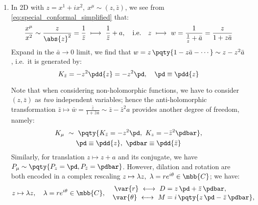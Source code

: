 \documentclass[a4paper,10pt]{article}
\begin{document}
\begin{enumerate}
\begin{enumerate}
	
	\item In 2D with $z = x^1 + ix^2,\ x^\mu\sim (z,\bar{z})$, we see from \eqref{eq:special_conformal_simplified} that:
	\begin{equation}
		\frac{x^\mu}{x^2}
		\sim \frac{z}{\abs{z}^2}
		= \frac{1}{\bar{z}}
		\ \longmapsto\ %
		\frac{1}{\bar{z}} + a,\quad
		\text{i.e.}\quad
		z\ \longmapsto\ 
		w = \frac{1}{\frac{1}{z} + \bar{a}}
		= \frac{z}{1 + z\bar{a}}
	\end{equation}
	Expand in the $\bar{a}\to 0$ limit, we find that $
		w = z\,\pqty{
			1 - z\bar{a} - \cdots
		} \sim z - z^2 \bar{a}
	$, i.e.\ it is generated by:
	\begin{equation}
		K_{\bar{z}}
		= -z^2 \pdd{z}
		= -z^2 \pd,\quad
		\pd \equiv \pdd{z}
	\end{equation}
\pagebreak[3]
	
	Note that when considering non-holomorphic functions, we have to consider $(z,\bar{z})$ as \textit{two} independent variables; hence the anti-holomorphic transformation $
		\bar{z}\mapsto\bar{w}
		= \frac{\bar{z}}{1 + \bar{z} a}
		\sim \bar{z} - \bar{z}^2 a
	$ provides another degree of freedom, namely:
	\begin{gather}
		K_\mu\ \sim\ \pqty{
			K_{\bar{z}} = -z^2 \pd,\ %
			K_{{z}} = -\bar{z}^2 \pdbar
		},\\
		\pd \equiv \pdd{z},\ %
		\pdbar \equiv \pdd{\bar{z}}\notag
	\end{gather}
	Similarly, for translation $z\mapsto z+a$ and its conjugate, we have $
		P_\mu\sim
		\pqty{P_z = \pd, P_{\bar{z}} = \pdbar}
	$. However, dilation and rotation are both encoded in a complex rescaling $
		z\mapsto \lambda z,\ %
		\lambda = re^{i\theta}\in\mbb{C}
	$; we have:
	\begin{equation}
		z\mapsto \lambda z,\quad
		\lambda = re^{i\theta}\in\mbb{C},\quad
	\begin{aligned}
		\var{r} \ \longleftrightarrow\ %
		D &= z\,\pd + \bar{z}\,\pdbar,\\[-.5ex]
		\var{\theta} \ \longleftrightarrow\ %
		M &= i\,\pqty{z\,\pd - \bar{z}\,\pdbar},
	\end{aligned}
	\end{equation}
	

\end{enumerate}
\end{enumerate}
\end{document}
